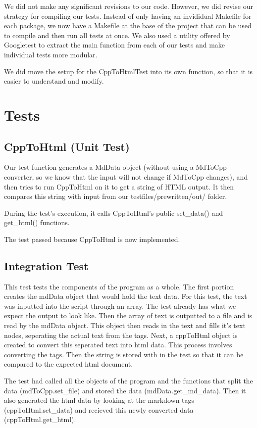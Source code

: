 \documentclass[12pt]{article}
\begin{document}
We did not make any significant revisions to our code. However, we did revise our strategy for compiling our tests. Instead of only having an invididual Makefile for each package, we now have a Makefile at the base of the project that can be used to compile and then run all tests at once. We also used a utility offered by Googletest to extract the main function from each of our tests and make individual tests more modular.

We did move the setup for the CppToHtmlTest into its own function, so that it is easier to understand and modify.
 \section{Tests}
\subsection{CppToHtml (Unit Test)}

Our test function generates a MdData object (without using a MdToCpp converter, so we know that the input will not change if MdToCpp changes), and then tries to run CppToHtml on it to get a string of HTML output. It then compares this string with input from our testfiles/prewritten/out/  folder. 

During the test's execution, it calls CppToHtml's public set\_data() and get\_html() functions.

The test passed because CppToHtml is now implemented.


\subsection{Integration Test}
This test tests the components of the program as a whole. The first portion creates the mdData object that would hold the text data. For this test, the text was inputted into the script through an array. The test already has what we expect the output to look like. Then the array of text is outputted to a file and is read by the mdData object. This object then reads in the text and fills it's text nodes, seperating the actual text from the tags. Next, a cppToHtml object is created to convert this seperated text into html data. This process involves converting the tags. Then the string is stored with in the test so that it can be compared to the expected html document. 

The test had called all the objects of the program and the functions that split the data (mdToCpp.set\_file) and stored the data (mdData.get\_md\_data). Then it also generated the html data by looking at the markdown tags (cppToHtml.set\_data) and recieved this newly converted data (cppToHtml.get\_html).  
\end{document}
